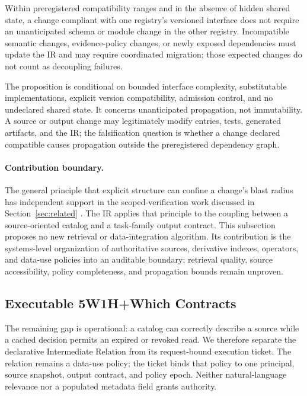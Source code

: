 \begin{proposition}
\label{prop:p17}
Within preregistered compatibility ranges and in the absence of hidden shared state, a change compliant with one registry's versioned interface does not require an unanticipated schema or module change in the other registry. Incompatible semantic changes, evidence-policy changes, or newly exposed dependencies must update the IR and may require coordinated migration; those expected changes do not count as decoupling failures.
\end{proposition}

The proposition is conditional on bounded interface complexity, substitutable implementations, explicit version compatibility, admission control, and no undeclared shared state. It concerns unanticipated propagation, not immutability. A source or output change may legitimately modify entries, tests, generated artifacts, and the IR; the falsification question is whether a change declared compatible causes propagation outside the preregistered dependency graph.

\paragraph{Contribution boundary.}
The general principle that explicit structure can confine a change's blast radius has independent support in the scoped-verification work discussed in Section~\ref{sec:related} \cite{hsu2026grace}. The IR applies that principle to the coupling between a source-oriented catalog and a task-family output contract. This subsection proposes no new retrieval or data-integration algorithm. Its contribution is the systems-level organization of authoritative sources, derivative indexes, operators, and data-use policies into an auditable boundary; retrieval quality, source accessibility, policy completeness, and propagation bounds remain unproven.

\subsection{Executable 5W1H+Which Contracts}
\label{sec:executable-ir}

The remaining gap is operational: a catalog can correctly describe a source while a cached decision permits an expired or revoked read. We therefore separate the declarative Intermediate Relation from its request-bound execution ticket. The relation remains a data-use policy; the ticket binds that policy to one principal, source snapshot, output contract, and policy epoch. Neither natural-language relevance nor a populated metadata field grants authority.

